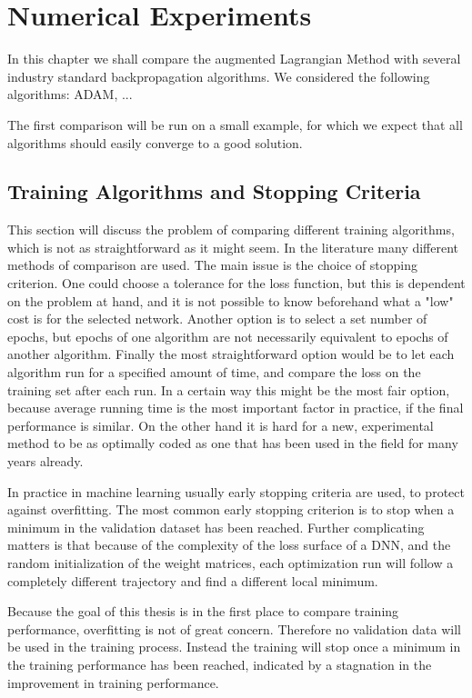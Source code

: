 \chapter{Numerical Experiments}
\label{cha:3}
In this chapter we shall compare the augmented Lagrangian Method with several industry standard backpropagation algorithms. We considered the following algorithms: ADAM, ...

The first comparison will be run on a small example, for which we expect that all algorithms should easily converge to a good solution.

\section{Training Algorithms and Stopping Criteria}
This section will discuss the problem of comparing different training algorithms, which is not as straightforward as it might seem. In the literature many different methods of comparison are used. The main issue is the choice of stopping criterion. One could choose a tolerance for the loss function, but this is dependent on the problem at hand, and it is not possible to know beforehand what a "low" cost is for the selected network. Another option is to select a set number of epochs, but epochs of one algorithm are not necessarily equivalent to epochs of another algorithm. Finally the most straightforward option would be to let each algorithm run for a specified amount of time, and compare the loss on the training set after each run. In a certain way this might be the most fair option, because average running time is the most important factor in practice, if the final performance is similar. On the other hand it is hard for a new, experimental method to be as optimally coded as one that has been used in the field for many years already.

In practice in machine learning usually early stopping criteria are used, to protect against overfitting. The most common early stopping criterion is to stop when a minimum in the validation dataset has been reached. Further complicating matters is that because of the complexity of the loss surface of a DNN, and the random initialization of the weight matrices, each optimization run will follow a completely different trajectory and find a different local minimum.

Because the goal of this thesis is in the first place to compare training performance, overfitting is not of great concern. Therefore no validation data will be used in the training process. Instead the training will stop once a minimum in the training performance has been reached, indicated by a stagnation in the improvement in training performance.

